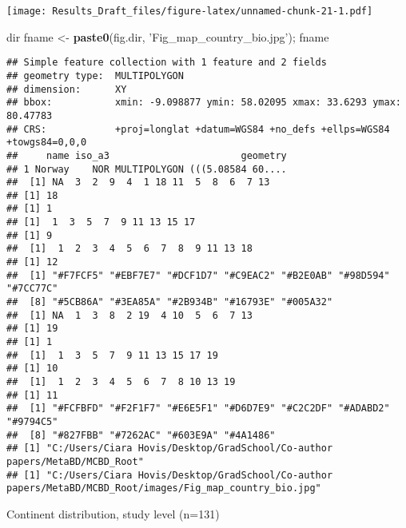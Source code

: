 \documentclass[
]{article}
\newenvironment{Shaded}{\begin{snugshade}}{\end{snugshade}}
\newcommand{\KeywordTok}[1]{\textcolor[rgb]{0.13,0.29,0.53}{\textbf{#1}}}
\newcommand{\NormalTok}[1]{#1}
\newcommand{\StringTok}[1]{\textcolor[rgb]{0.31,0.60,0.02}{#1}}
\begin{document}
\texttt{[image: Results\_Draft\_files/figure-latex/unnamed-chunk-21-1.pdf]}

\begin{Shaded}
\begin{Highlighting}[]
\NormalTok{dir}
\NormalTok{fname <-}\StringTok{ }\KeywordTok{paste0}\NormalTok{(fig.dir, }\StringTok{'Fig_map_country_bio.jpg'}\NormalTok{); fname}
\end{Highlighting}
\end{Shaded}

\begin{verbatim}
## Simple feature collection with 1 feature and 2 fields
## geometry type:  MULTIPOLYGON
## dimension:      XY
## bbox:           xmin: -9.098877 ymin: 58.02095 xmax: 33.6293 ymax: 80.47783
## CRS:            +proj=longlat +datum=WGS84 +no_defs +ellps=WGS84 +towgs84=0,0,0
##     name iso_a3                       geometry
## 1 Norway    NOR MULTIPOLYGON (((5.08584 60....
##  [1] NA  3  2  9  4  1 18 11  5  8  6  7 13
## [1] 18
## [1] 1
## [1]  1  3  5  7  9 11 13 15 17
## [1] 9
##  [1]  1  2  3  4  5  6  7  8  9 11 13 18
## [1] 12
##  [1] "#F7FCF5" "#EBF7E7" "#DCF1D7" "#C9EAC2" "#B2E0AB" "#98D594" "#7CC77C"
##  [8] "#5CB86A" "#3EA85A" "#2B934B" "#16793E" "#005A32"
##  [1] NA  1  3  8  2 19  4 10  5  6  7 13
## [1] 19
## [1] 1
##  [1]  1  3  5  7  9 11 13 15 17 19
## [1] 10
##  [1]  1  2  3  4  5  6  7  8 10 13 19
## [1] 11
##  [1] "#FCFBFD" "#F2F1F7" "#E6E5F1" "#D6D7E9" "#C2C2DF" "#ADABD2" "#9794C5"
##  [8] "#827FBB" "#7262AC" "#603E9A" "#4A1486"
## [1] "C:/Users/Ciara Hovis/Desktop/GradSchool/Co-author papers/MetaBD/MCBD_Root"
## [1] "C:/Users/Ciara Hovis/Desktop/GradSchool/Co-author papers/MetaBD/MCBD_Root/images/Fig_map_country_bio.jpg"
\end{verbatim}

Continent distribution, study level (n=131)
\end{document}
